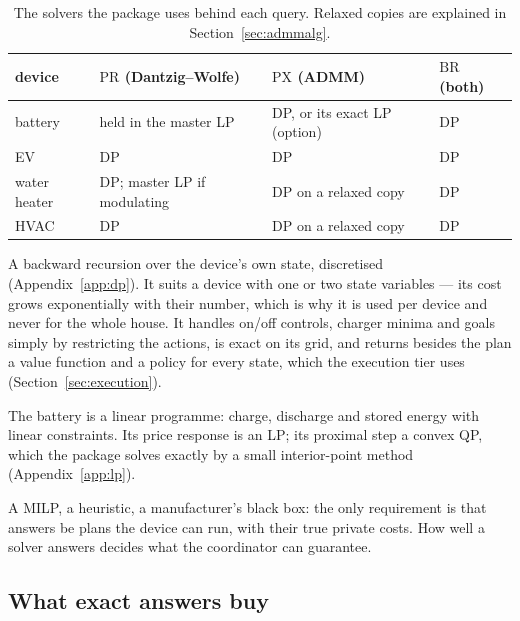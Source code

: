 \documentclass[11pt,a4paper]{article}
\newcommand{\PR}{\mathrm{PR}}
\newcommand{\PX}{\mathrm{PX}}
\newcommand{\BR}{\mathrm{BR}}
\begin{document}
\begin{table}[htbp]
\centering
\small
\begin{tabular}{@{}llll@{}}
\toprule
device & $\PR$ (Dantzig--Wolfe) & $\PX$ (ADMM) & $\BR$ (both) \\
\midrule
battery      & held in the master LP          & DP, or its exact LP (option) & DP \\
EV           & DP                             & DP                           & DP \\
water heater & DP; master LP if modulating    & DP on a relaxed copy         & DP \\
HVAC         & DP                             & DP on a relaxed copy         & DP \\
\bottomrule
\end{tabular}
\caption{The solvers the package uses behind each query. Relaxed copies are
explained in Section~\ref{sec:admmalg}.}
\label{tab:solvers}
\end{table}

\begin{description}[leftmargin=*,itemsep=2pt]
\item[DP.] A backward recursion over the device's own
  state, discretised (Appendix~\ref{app:dp}). It suits a device with one or two
  state variables --- its cost grows exponentially with their number, which is
  why it is used per device and never for the whole house. It handles on/off
  controls, charger minima and goals simply by restricting the actions, is exact
  on its grid, and returns besides the plan a value function and a policy for
  every state, which the execution tier uses (Section~\ref{sec:execution}).
\item[LP and QP.] The battery is a linear
  programme: charge, discharge and stored energy with linear constraints. Its
  price response is an LP; its proximal step a convex QP, which the package
  solves exactly by a small interior-point method (Appendix~\ref{app:lp}).
\item[Anything else.] A MILP, a heuristic, a manufacturer's black box: the only
  requirement is that answers be plans the device can run, with their true
  private costs. How well a solver answers decides what the coordinator can
  guarantee.
\end{description}

\subsection{What exact answers buy}
\label{sec:exactness}
\end{document}
